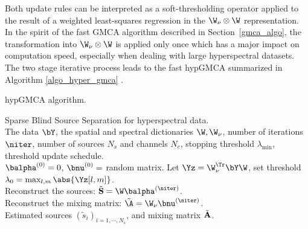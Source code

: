 
Both update rules can be interpreted as a soft-thresholding operator applied to the result of a weighted least-squares regression in the ${\W_\nu}\otimes {\W}$ representation. In the spirit of the fast GMCA algorithm described in Section~\ref{gmca_algo}, the transformation into ${\W_\nu}\otimes {\W}$ is applied only once which has a major impact on computation speed, especially when dealing with large hyperspectral datasets. The two stage iterative process leads to the fast hypGMCA summarized in Algorithm \ref{algo_hyper_gmca} \citep{moudden08}.

{\linespread{1}
\begin{algorithm}[htb]
\caption{hypGMCA algorithm.}
\label{algo_hyper_gmca}
 Sparse Blind Source Separation for hyperspectral data.\\
 The data $\bY$, the spatial and spectral dictionaries $\W,\W_\nu$, number of iterations $\niter$, number of sources $N_s$ and channels $N_c$, stopping threshold $\lambda_{\min}$, threshold update schedule.\\
 $\balpha^{(0)} = 0$,  $\bnu^{(0)} = $ random matrix. Let $\Yz = \W_\nu^\Tr\bY\W$, set threshold $\lambda_0 = \max_{l,m}\abs{\Yz[l,m]}$.
 \\
Reconstruct the sources: $\tilde{\bf S} =  {\W} \balpha^{(\niter)}$.\\
Reconstruct the mixing matrix: $\tilde{\A} =  {\W_\nu} \bnu^{(\niter)}$.\\	
 Estimated sources $\left(\tilde{s}_{i}\right)_{i=1, \cdots, N_s}$, and mixing matrix $\tilde{{\bf{A}}}$.
\end{algorithm}
}

